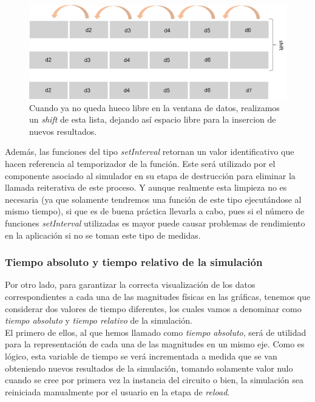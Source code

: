 \documentclass[../main.tex]{subfiles}
\begin{document}
\begin{figure}[!h]
    \centering
    \includegraphics[width=\textwidth]{images/ventana_datos_2.png}
    \caption{Cuando ya no queda hueco libre en la ventana de datos, realizamos un \textit{shift} de esta lista, dejando así espacio libre para la insercion de nuevos resultados.}
    \label{fig::ventana_datos_2}
\end{figure}

Además, las funciones del tipo \textit{setInterval} retornan un valor identificativo que hacen referencia al temporizador de la función. Este será utilizado por el componente asociado al simulador en su etapa de destrucción para eliminar la llamada reiterativa de este proceso. Y aunque realmente esta limpieza no es necesaria (ya que solamente tendremos una función de este tipo ejecutándose al mismo tiempo), si que es de buena práctica llevarla a cabo, pues si el número de funciones \textit{setInterval} utilizadas es mayor puede causar problemas de rendimiento en la aplicación si no se toman este tipo de medidas.\\

\subsubsection{Tiempo absoluto y tiempo relativo de la simulación}
Por otro lado, para garantizar la correcta visualización de los datos correspondientes a cada una de las magnitudes físicas en las gráficas, tenemos que considerar dos valores de tiempo diferentes, los cuales vamos a denominar como \textit{tiempo absoluto} y \textit{tiempo relativo} de la simulación.\\

El primero de ellos, al que hemos llamado como \textit{tiempo absoluto}, será de utilidad para la representación de cada una de las magnitudes en un mismo eje. Como es lógico, esta variable de tiempo se verá incrementada a medida que se van obteniendo nuevos resultados de la simulación, tomando solamente valor nulo cuando se cree por primera vez la instancia del circuito o bien, la simulación sea reiniciada manualmente por el usuario en la etapa de \textit{reload}. 
\end{document}
